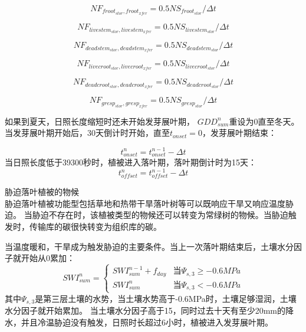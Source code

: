 \begin{equation}
  NF_{froot_{stor},froot_{xfer}}=0.5  NS_{froot_{stor}}/\Delta t
\end{equation}

\begin{equation}
  NF_{livestem_{stor},livestem_{xfer}}=0.5  NS_{livestem_{stor}}/\Delta t
\end{equation}

\begin{equation}
  NF_{deadstem_{stor},deadstem_{xfer}}=0.5 NS_{deadstem_{stor}}/\Delta t
\end{equation}

\begin{equation}
  NF_{livecroot_{stor},livecroot_{xfer}}=0.5  NS_{livecroot_{stor}}/\Delta t
\end{equation}

\begin{equation}
  NF_{deadcroot_{stor},deadcroot_{xfer}}=0.5 NS_{deadcroot_{stor}}/\Delta t
\end{equation}

\begin{equation}
  NF_{gresp_{stor},gresp_{xfer}}=0.5 NS_{gresp_{stor}}/\Delta t
\end{equation}


如果到夏天，日照长度缩短时还未开始发芽展叶期，
$GDD_{sum}^n$重设为0直至冬天。当发芽展叶期开始后，30天倒计时开始，直至$t_{onset}=0$，发芽展叶期结束：

\begin{equation}
t_{onset}^n=t_{onset}^{n-1}-\Delta t
\end{equation}
当日照长度低于39300秒时，植被进入落叶期，落叶期倒计时为15天：
\begin{equation}
  t_{offset}^n=t_{offset}^{n-1}-\Delta t
\end{equation}

胁迫落叶植被的物候\\

胁迫落叶植被功能型包括草地和热带干旱落叶树等可以既响应干旱又响应温度胁迫。
当胁迫不存在时，该植被类型的物候还可以转变为常绿树的物候。当胁迫触发时，传输库的碳很快转变为组织库的碳。


当温度暖和，干旱成为触发胁迫的主要条件。当上一次落叶期结束后，土壤水分因子就开始从0累加：
\begin{equation}
SWI_{sum}^{n}=\left\{\begin{array}{ll}SWI_{sum}^{n-1}+f_{d a y} &  { 当 } \Psi_{s, 3} \geq-0.6 M P a \\ SWI_{sum}^{n} &  { 当 } \Psi_{s, 3}<-0.6 M P a\end{array}\right.
\end{equation}
其中$\Psi_{s,3}$是第三层土壤的水势，当土壤水势高于-0.6MPa时，土壤足够湿润，土壤水分因子就开始累加。
当土壤水分因子高于15，同时过去十天有至少20mm的降水，并且冷温胁迫没有触发，日照时长超过6小时，植被进入发芽展叶期。



